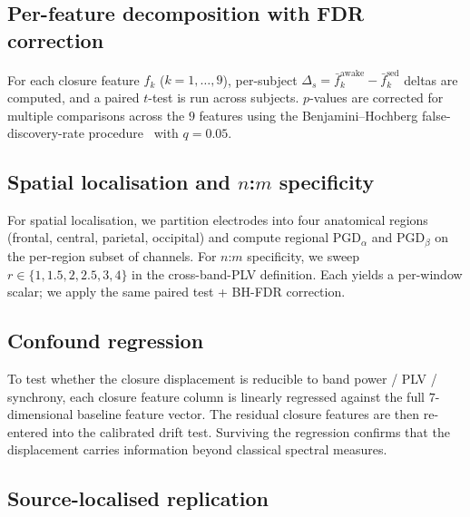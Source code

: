 \documentclass[11pt,a4paper]{article}
\begin{document}
\subsection{Per-feature decomposition with FDR correction}

For each closure feature $f_k$ ($k=1,\dots,9$), per-subject $\Delta_s = \bar{f}_k^{\text{awake}} - \bar{f}_k^{\text{sed}}$ deltas are computed, and a paired $t$-test is run across subjects. $p$-values are corrected for multiple comparisons across the $9$ features using the Benjamini--Hochberg false-discovery-rate procedure~\cite{benjamini1995controlling} with $q=0.05$.

\subsection{Spatial localisation and $n$:$m$ specificity}

For spatial localisation, we partition electrodes into four anatomical regions (frontal, central, parietal, occipital) and compute regional $\mathrm{PGD}_\alpha$ and $\mathrm{PGD}_\beta$ on the per-region subset of channels. For $n$:$m$ specificity, we sweep $r\in\{1,1.5,2,2.5,3,4\}$ in the cross-band-PLV definition. Each yields a per-window scalar; we apply the same paired test + BH-FDR correction.

\subsection{Confound regression}

To test whether the closure displacement is reducible to band power / PLV / synchrony, each closure feature column is linearly regressed against the full $7$-dimensional baseline feature vector. The residual closure features are then re-entered into the calibrated drift test. Surviving the regression confirms that the displacement carries information beyond classical spectral measures.

\subsection{Source-localised replication}\label{sec:source-methods}
\end{document}
